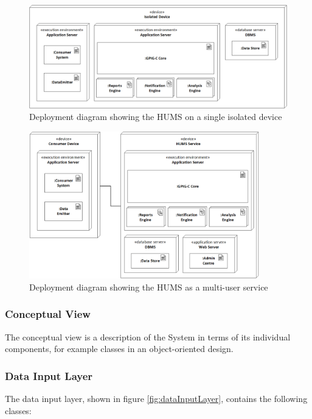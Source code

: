 \documentclass[10pt,a4paper]{article}
\begin{document}
\begin{figure}[!ht]
  \centering
  \includegraphics[width=12.5cm]{images/DeploymentIsolated.png}
  \caption{Deployment diagram showing the HUMS on a single isolated device}
  \label{fig:DeploymentIsolated}
\end{figure}

\begin{figure}[!ht]
  \centering
  \includegraphics[width=10cm]{images/DeploymentService.png}
  \caption{Deployment diagram showing the HUMS as a multi-user service}
  \label{fig:DeploymentService}
\end{figure}

\subsubsection{Conceptual View}
The conceptual view is a description of the System in terms of its individual components, for example classes in an object-oriented design.

\subsubsection*{Data Input Layer}

The data input layer, shown in figure \ref{fig:dataInputLayer},
contains the following classes:
\end{document}
